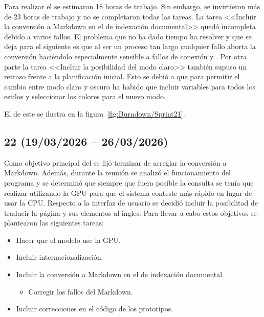 Para realizar el  se estimaron 18 horas de trabajo. Sin embargo, se invirtieron más de 23 horas de trabajo y no se completaron todas las tareas. La tarea <<Incluir la conversión a Markdown en el  de indexación documental>> quedó incompleta debido a varios fallos. El problema que no ha dado tiempo ha resolver y que se deja para el  siguiente es que al ser un proceso tan largo cualquier fallo aborta la conversión haciéndolo especialmente sensible a fallos de conexión y . Por otra parte la tarea <<Incluir la posibilidad del modo claro>> también supuso un retraso frente a la planificación inicial. Esto se debió a que para permitir el cambio entre modo claro y oscuro ha habido que incluir variables para todos los estilos y seleccionar los colores para el nuevo modo.

El  de este  se ilustra en la figura~\ref{fig:Burndown/Sprint21}.

\subsection{ 22 (19/03/2026 -- 26/03/2026)}
Como objetivo principal del  se fijó terminar de arreglar la conversión a Markdown. Además, durante la reunión se analizó el funcionamiento del programa y se determinó que siempre que fuera posible la consulta se tenía que realizar utilizando la GPU para que el sistema conteste más rápido en lugar de usar la CPU. Respecto a la interfaz de usuario se decidió incluir la posibilitad de traducir la página y sus elementos al ingles. Para llevar a cabo estos objetivos se plantearon las siguientes tareas:

\begin{itemize}
\tightlist
	\item Hacer que el modelo use la GPU.
	\item Incluir internacionalización.
	\item Incluir la conversión a Markdown en el  de indexación documental.
	\begin{itemize}
	\tightlist
		\item Corregir los fallos del Markdown.
	\end{itemize}
	\item Incluir correcciones en el código de los prototipos.
\end{itemize}

